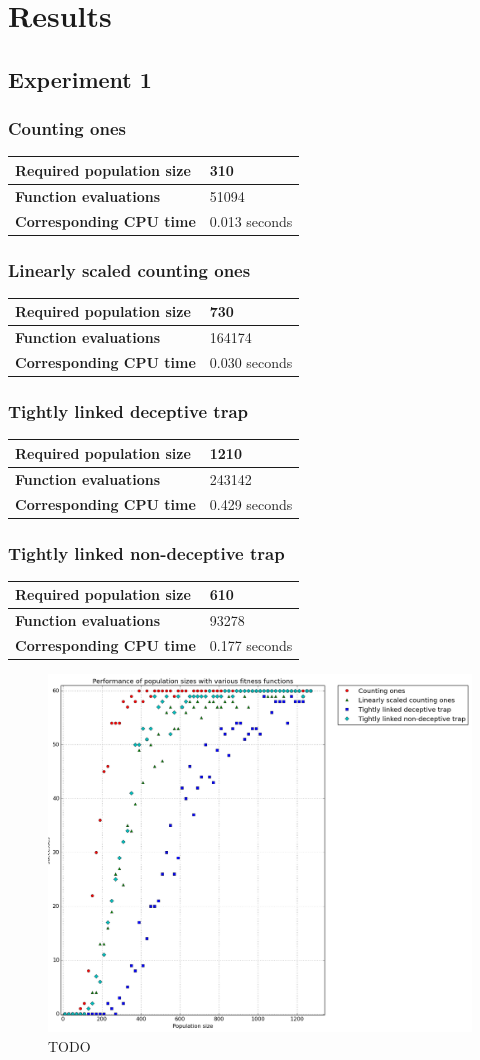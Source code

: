\documentclass[12pt]{article}
\theoremstyle{definition}
\newcommand{\mytable}[3]{
\begin{table}[H]
\begin{tabular}{|ll|}
\hline
\textbf{Required population size} & #1            \\ \hline
\textbf{Function evaluations}     & #2            \\ \hline
\textbf{Corresponding CPU time}   & #3 seconds    \\ \hline
\end{tabular}
\end{table}
}
\begin{document}
\maketitle

\section*{Results}

\subsection*{Experiment 1}

\subsubsection*{Counting ones}
\mytable{310}{51094}{0.013}

\subsubsection*{Linearly scaled counting ones}
\mytable{730}{164174}{0.030}

\subsubsection*{Tightly linked deceptive trap}
\mytable{1210}{243142}{0.429}

\subsubsection*{Tightly linked non-deceptive trap}
\mytable{610}{93278}{0.177}


\begin{figure}[H]
    \centering
    \includegraphics[width=1\linewidth]{images/exp1.png}
    \caption{TODO}
\label{fig:exp1}
\end{figure}
\end{document}
